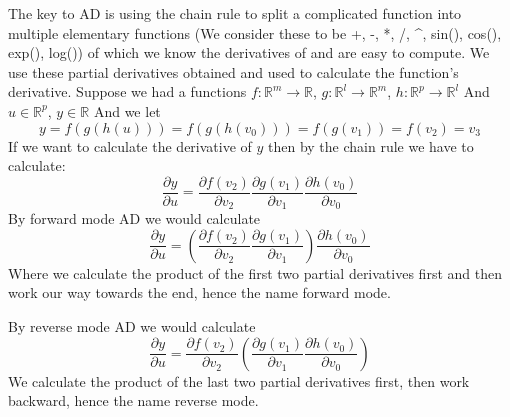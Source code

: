 \documentclass{article}
\begin{document}
The key to AD is using the chain rule to split a complicated function into multiple elementary functions (We consider these to be +, -, *, /, \textasciicircum, sin(), cos(), exp(), log()) of which we know the derivatives of and are easy to compute. We use these partial derivatives obtained and used to calculate the function's derivative.
Suppose we had a functions $f:\mathbb{R}^m \rightarrow \mathbb{R}$, $g:\mathbb{R}^l \rightarrow \mathbb{R}^m$, $h:\mathbb{R}^p \rightarrow \mathbb{R}^l$ And $u \in \mathbb{R}^p$, $y \in \mathbb{R}$ And we let
\begin{equation}
    y = f(g(h(u))) = f(g(h(v_0))) = f(g(v_1)) = f(v_2) = v_3
\end{equation}
If we want to calculate the derivative of $y$ then by the chain rule we have to calculate:
\begin{equation}
    \frac{\partial{y}}{\partial{u}} = \frac{\partial{f(v_2)}}{\partial{v_2}}\frac{\partial{g(v_1)}}{\partial{v_1}}\frac{\partial{h(v_0)}}{\partial{v_0}}
\end{equation}
By forward mode AD we would calculate
\begin{equation}
    \frac{\partial{y}}{\partial{u}} = \left(\frac{\partial{f(v_2)}}{\partial{v_2}}\frac{\partial{g(v_1)}}{\partial{v_1}}\right)\frac{\partial{h(v_0)}}{\partial{v_0}}
\end{equation}
Where we calculate the product of the first two partial derivatives first and then work our way towards the end, hence the name forward mode.

By reverse mode AD we would calculate
\begin{equation}
    \frac{\partial{y}}{\partial{u}} = \frac{\partial{f(v_2)}}{\partial{v_2}}\left(\frac{\partial{g(v_1)}}{\partial{v_1}}\frac{\partial{h(v_0)}}{\partial{v_0}}\right)
\end{equation}
We calculate the product of the last two partial derivatives first, then work backward, hence the name reverse mode. \cite{dhamarticle}
\end{document}
